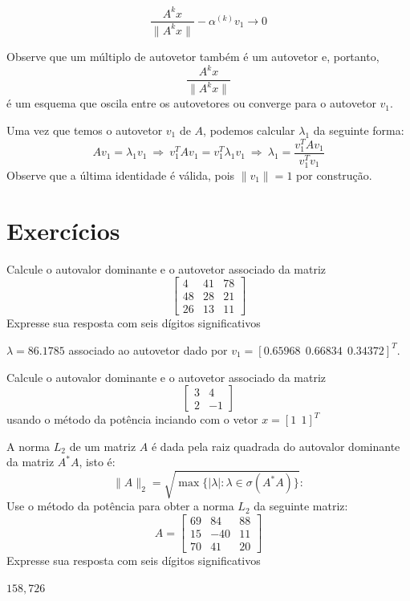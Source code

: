 $$\frac{A^k {x}}{\|A^k {x}\|}-\alpha^{(k)}{v}_1 \to 0$$

Observe que um múltiplo de autovetor  também é um autovetor e, portanto, 
$$
\frac{A^k {x}}{\|A^k {x}\|}
$$
é um esquema que oscila entre os autovetores ou converge para o autovetor ${v}_1$.


Uma vez que temos o autovetor ${v}_1$ de $A$, podemos calcular $\lambda_1$ da seguinte forma:
$$
A{v}_1=\lambda_1 {v}_1 ~\Longrightarrow~ {v}_1^TA{v}_1={v}_1^T\lambda_1 {v}_1 ~ \Longrightarrow~ \lambda_1=\frac{{v}_1^TA{v}_1}{{v}_1^T{v}_1}
$$
Observe que a última identidade é válida, pois $\|{v}_1\|=1$ por construção.

\section*{Exercícios}

\begin{Exercise} Calcule o autovalor dominante e o autovetor associado da matriz
$$\left[\begin{array}{ccc}
 4&     41  &  78\\
 48   & 28&    21  \\
 26   & 13 &   11
\end{array}\right]
$$
Expresse sua resposta com seis dígitos significativos
\end{Exercise}
\begin{Answer}
  \begin{tiny}
$\lambda=86.1785$ associado ao autovetor dado por $v_1=\left[ 0.65968~~ 0.66834~~ 0.34372\right]^T$.    
  \end{tiny}
\end{Answer}

\begin{Exercise}Calcule o autovalor dominante e o autovetor associado da matriz
$$
\left[\begin{array}{cc}
3&4\\2&-1
\end{array}\right]
$$
usando o método da potência inciando com o vetor $x=[1~~  1]^T$
\end{Exercise}

\begin{Exercise} A norma $L_2$ de um matriz $A$  é dada pela raiz quadrada do autovalor dominante da matriz $A^*A$, isto é: $$\|A\|_2=\sqrt{\max\{|\lambda|: \lambda\in\sigma(A^*A)\}}:$$
Use o método da potência para obter a norma $L_2$ da seguinte matriz:
$$A=\left[\begin{array}{ccc}

    69&    84&    88\\
    15&  - 40&    11\\
    70&    41&    20
\end{array}\right]
$$
Expresse sua resposta com seis dígitos significativos
\end{Exercise}
\begin{Answer} 
  \begin{tiny}
$158,726$    
  \end{tiny}
\end{Answer}


